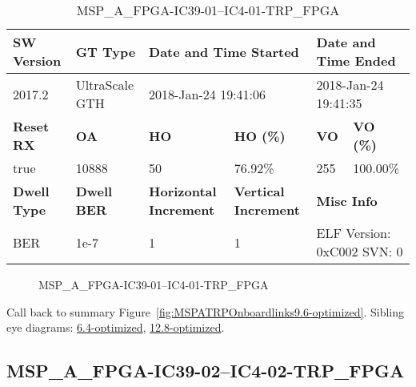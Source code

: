 \begin{table}[h]
\centering
\caption{MSP\_A\_FPGA-IC39-01--IC4-01-TRP\_FPGA}
\label{tab:MSPAFPGAIC3901IC401TRPFPGA9.6-optimized}
\begin{tabular}{@{}|l|l|l|l|l|l|@{}}
\toprule
\textbf{SW Version}                & \textbf{GT Type}   & \multicolumn{2}{l|}{\textbf{Date and Time Started}}            & \multicolumn{2}{l|}{\textbf{Date and Time Ended}}        \\ \midrule
2017.2                       & UltraScale GTH          & \multicolumn{2}{l|}{2018-Jan-24 19:41:06}                   & \multicolumn{2}{l|}{2018-Jan-24 19:41:35}               \\ \midrule
\textbf{Reset RX}                  & \textbf{OA} & \textbf{HO}   & \textbf{HO (\%)} & \textbf{VO} & \textbf{VO (\%)} \\ \midrule
true & 10888        & 50          & 76.92\%        & 255        & 100.00\%       \\ \midrule
\textbf{Dwell Type}                & \textbf{Dwell BER} & \textbf{Horizontal Increment} & \textbf{Vertical Increment}    & \multicolumn{2}{l|}{\textbf{Misc Info}}                  \\ \midrule
BER                            & 1e-7        & 1        & 1           & \multicolumn{2}{l|}{ELF Version: 0xC002 SVN: 0}                         \\ \bottomrule
\end{tabular}
\end{table}

\begin{figure}[h]
\caption{MSP\_A\_FPGA-IC39-01--IC4-01-TRP\_FPGA} \label{fig:MSPAFPGAIC3901IC401TRPFPGA9.6-optimized}
\end{figure}

Call back to summary Figure~\ref{fig:MSPATRPOnboardlinks9.6-optimized}.
Sibling eye diagrams: \hyperref[sec:MSPAFPGAIC3901IC401TRPFPGA6.4-optimized]{6.4-optimized}, \hyperref[sec:MSPAFPGAIC3901IC401TRPFPGA12.8-optimized]{12.8-optimized}.

\clearpage
\newpage


\subsection{MSP\_A\_FPGA-IC39-02--IC4-02-TRP\_FPGA}\label{sec:MSPAFPGAIC3902IC402TRPFPGA9.6-optimized}

